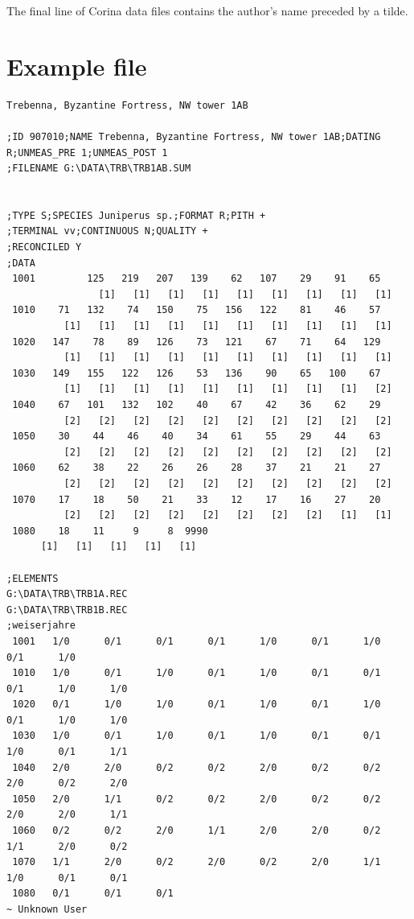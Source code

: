 The final line of Corina data files contains the author's name preceded by a tilde. 

\newpage
\section{Example file}

\begin{lstlisting}
Trebenna, Byzantine Fortress, NW tower 1AB

;ID 907010;NAME Trebenna, Byzantine Fortress, NW tower 1AB;DATING R;UNMEAS_PRE 1;UNMEAS_POST 1
;FILENAME G:\DATA\TRB\TRB1AB.SUM


;TYPE S;SPECIES Juniperus sp.;FORMAT R;PITH +
;TERMINAL vv;CONTINUOUS N;QUALITY +
;RECONCILED Y
;DATA         
 1001         125   219   207   139    62   107    29    91    65
                [1]   [1]   [1]   [1]   [1]   [1]   [1]   [1]   [1]
 1010    71   132    74   150    75   156   122    81    46    57
          [1]   [1]   [1]   [1]   [1]   [1]   [1]   [1]   [1]   [1]
 1020   147    78    89   126    73   121    67    71    64   129
          [1]   [1]   [1]   [1]   [1]   [1]   [1]   [1]   [1]   [1]
 1030   149   155   122   126    53   136    90    65   100    67
          [1]   [1]   [1]   [1]   [1]   [1]   [1]   [1]   [1]   [2]
 1040    67   101   132   102    40    67    42    36    62    29
          [2]   [2]   [2]   [2]   [2]   [2]   [2]   [2]   [2]   [2]
 1050    30    44    46    40    34    61    55    29    44    63
          [2]   [2]   [2]   [2]   [2]   [2]   [2]   [2]   [2]   [2]
 1060    62    38    22    26    26    28    37    21    21    27
          [2]   [2]   [2]   [2]   [2]   [2]   [2]   [2]   [2]   [2]
 1070    17    18    50    21    33    12    17    16    27    20
          [2]   [2]   [2]   [2]   [2]   [2]   [2]   [2]   [1]   [1]
 1080    18    11     9     8  9990
      [1]   [1]   [1]   [1]   [1]

;ELEMENTS 
G:\DATA\TRB\TRB1A.REC
G:\DATA\TRB\TRB1B.REC
;weiserjahre   
 1001   1/0      0/1      0/1      0/1      1/0      0/1      1/0      0/1      1/0   
 1010   1/0      0/1      1/0      0/1      1/0      0/1      0/1      0/1      1/0      1/0   
 1020   0/1      1/0      1/0      0/1      1/0      0/1      1/0      0/1      1/0      1/0   
 1030   1/0      0/1      1/0      0/1      1/0      0/1      0/1      1/0      0/1      1/1   
 1040   2/0      2/0      0/2      0/2      2/0      0/2      0/2      2/0      0/2      2/0   
 1050   2/0      1/1      0/2      0/2      2/0      0/2      0/2      2/0      2/0      1/1   
 1060   0/2      0/2      2/0      1/1      2/0      2/0      0/2      1/1      2/0      0/2   
 1070   1/1      2/0      0/2      2/0      0/2      2/0      1/1      1/0      0/1      0/1   
 1080   0/1      0/1      0/1   
~ Unknown User
\end{lstlisting}




